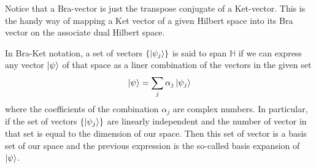 \begin{flushleft}
    Notice that a Bra-vector is just the transpose conjugate of a Ket-vector. This is the handy way of mapping a Ket vector of a given Hilbert space into its Bra vector on the associate dual Hilbert space.
\end{flushleft}
\begin{corollary}
    In Bra-Ket notation, a set of vectors $\{\ket{\psi_{j}}\}$ is said to span $\mathbb{H}$ if we can express any vector $\ket{\psi}$ of that space as a liner combination of the vectors in the given set
    \begin{equation}
        \ket{\psi} = \sum_{j}\alpha_{j}\ket{\psi_{j}}
    \end{equation}
    where the coefficients of the combination $\alpha_{j}$ are complex numbers. In particular, if the set of vectors $\{\ket{\psi_{j}}\}$ are linearly independent and the number of vector in that set is equal to the dimension of our space. Then this set of vector is a basis set of our space and the previous expression is the so-called basis expansion of $\ket{\psi}$.
\end{corollary}
\begin{flushleft}
\end{flushleft}
